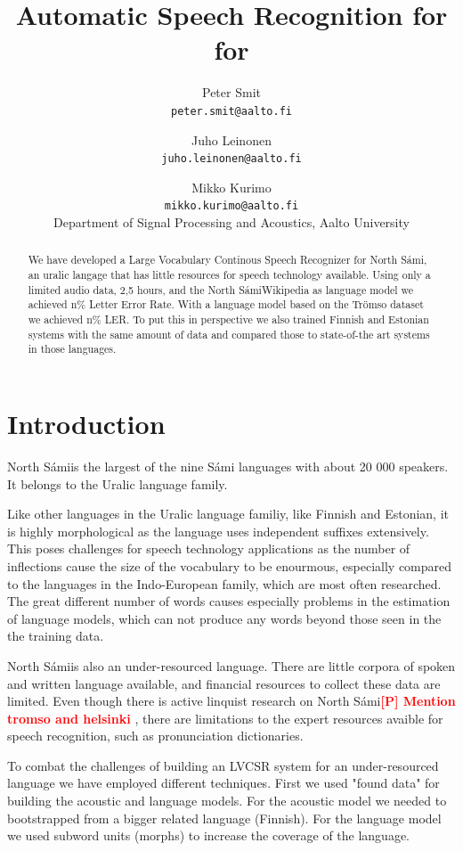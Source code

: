 \documentclass[b5paper]{article}
\title{Automatic Speech Recognition for  for \ns}
\author{Peter Smit \\ \texttt{peter.smit@aalto.fi} \and Juho Leinonen \\ \texttt{juho.leinonen@aalto.fi} \and Mikko Kurimo\\ \texttt{mikko.kurimo@aalto.fi}  \\
[0.5cm]Department of Signal Processing and Acoustics, Aalto University\\}
\newcommand{\todo}[2]{{\textcolor{red}{\bf [#1] #2 }}}
\newcommand{\ns}{{North Sámi}}
\begin{document}
\maketitle

\begin{abstract} We have developed a Large Vocabulary Continous Speech Recognizer for \ns, an uralic langage that has little resources for speech technology available. Using only a limited audio data, 2,5 hours, and the \ns Wikipedia as language model we achieved n\% Letter Error Rate. With a language model based on the Trömso dataset we achieved n\% LER. To put this in perspective we also trained Finnish and Estonian systems with the same amount of data and compared those to state-of-the art systems in those languages.   \end{abstract}

\section{Introduction}

\ns is the largest of the nine Sámi languages with about 20 000 speakers. It belongs to the Uralic language family.

Like other languages in the Uralic language familiy, like Finnish and Estonian, it is highly morphological as the language uses independent suffixes extensively. This poses challenges for speech technology applications as the number of inflections cause the size of the vocabulary to be enourmous, especially compared to the languages in the Indo-European family, which are most often researched. The great different number of words causes especially problems in the estimation of language models, which can not produce any words beyond those seen in the the training data. 

\ns is also an under-resourced language. There are little corpora of spoken and written language available, and financial resources to collect these data are limited. Even though there is active linquist research on \ns \todo{P}{Mention tromso and helsinki}, there are limitations to the expert resources avaible for speech recognition, such as pronunciation dictionaries. 

To combat the challenges of building an LVCSR system for an under-resourced language we have employed different techniques. First we used "found data" for building the acoustic and language models. For the acoustic model we needed to bootstrapped from a bigger related language (Finnish). For the language model we used subword units (morphs) to increase the coverage of the language.
\end{document}
